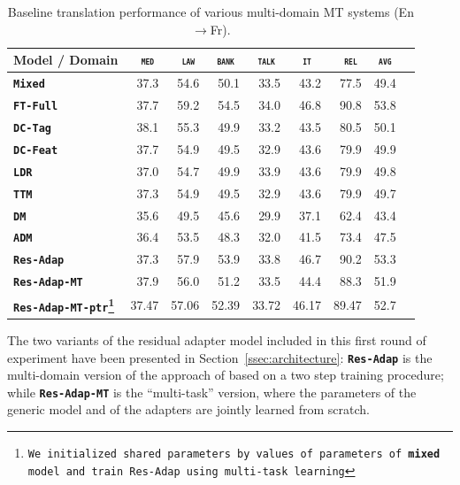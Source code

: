 \documentclass[11pt,a4paper]{article}
\newcommand{\domain}[1]{\texttt{\textsc{#1}}}
\newcommand{\system}[1]{\texttt{\textbf{#1}}}
\begin{document}
\begin{table}[t!]
  \centering
  \begin{tabular}{|p{4.3cm}|*{8}{r|}} \hline
    Model / Domain & \multicolumn{1}{c|}{\domain{ med}} & \multicolumn{1}{c|}{\domain{ law}} & \multicolumn{1}{c|}{\domain{bank}} & \multicolumn{1}{c|}{\domain{talk}} & \multicolumn{1}{c|}{\domain{ it }} & \multicolumn{1}{c|}{\domain{ rel}} & \multicolumn{1}{c|}{\domain{avg}} \\ \hline 
    \system{Mixed}        & 37.3 & 54.6 & 50.1 & 33.5 & 43.2 & 77.5  &  49.4 \\
    \system{FT-Full}       & 37.7 & 59.2 & 54.5 & 34.0 & 46.8 & 90.8 & 53.8 \\
    \hline 
    \system{DC-Tag}      & 38.1 & 55.3 & 49.9   & 33.2 & 43.5 & 80.5  & 50.1 \\
    \system{DC-Feat}     & 37.7 & 54.9 & 49.5   & 32.9 & 43.6 & 79.9 & 49.9  \\
    \system{LDR}            & 37.0  & 54.7 & 49.9 & 33.9 & 43.6 & 79.9 & 49.8    \\
    \system{TTM}           & 37.3  & 54.9 & 49.5 & 32.9 & 43.6 & 79.9 & 49.7   \\
    \system{DM}            & 35.6  & 49.5  & 45.6 & 29.9 & 37.1 & 62.4 & 43.4   \\ 
    \system{ADM}          & 36.4  & 53.5  & 48.3 & 32.0 & 41.5 & 73.4 & 47.5   \\
    \hline
    \system{Res-Adap}         & 37.3 & 57.9 & 53.9 & 33.8 & 46.7 & 90.2 & 53.3 \\ 
    \system{Res-Adap-MT}  & 37.9 & 56.0 & 51.2  & 33.5 & 44.4 & 88.3 & 51.9 \\
    \system{Res-Adap-MT-ptr\footnote{We initialized shared parameters by values of parameters of \system{mixed} model and train Res-Adap using multi-task learning}} & 37.47 & 57.06 & 52.39 & 33.72 & 46.17 & 89.47 & 52.7 \\
    \hline
  \end{tabular}
  \caption{Baseline translation performance of various multi-domain MT systems (En$\rightarrow$Fr).}
  \label{tab:performance-multi}
\end{table}
The two variants of the residual adapter model included in this first round of experiment have been presented in Section~\ref{ssec:architecture}: \system{Res-Adap} is the multi-domain version of the approach of \citet{Bapna19simple} based on a two step training procedure; while \system{Res-Adap-MT} is the ``multi-task'' version, where the parameters of the generic model and of the adapters are jointly learned from scratch.
\end{document}
